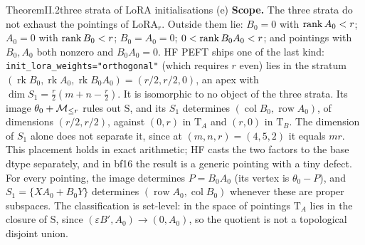 \begin{restate}{Theorem}{II.2}{three strata of LoRA initialisations}
(e) \textbf{Scope.} The three strata do not exhaust the pointings of LoRA$_r$. Outside them lie: $B_0=0$ with
$\operatorname{rank} A_0<r$; $A_0=0$ with $\operatorname{rank} B_0<r$; $B_0=A_0=0$; $0<\operatorname{rank} B_0A_0<r$; and pointings with $B_0,A_0$ both nonzero and
$B_0A_0=0$. HF PEFT ships one of the last kind: \texttt{init\_lora\_\allowbreak weights=\allowbreak"orthogonal"} (which
requires $r$ even) lies in the stratum $(\operatorname{rk}B_0,\operatorname{rk}A_0,\operatorname{rk}B_0A_0)=(r/2,r/2,0)$,
an apex with $\dim S_1=\tfrac r2(m+n-\tfrac r2)$. It is isomorphic to no object of the three strata. Its image
$\theta_0+\mathcal{M}_{\le r}$ rules out $\mathrm S$, and its $S_1$ determines $(\operatorname{col}B_0,\operatorname{row}A_0)$, of
dimensions $(r/2,r/2)$, against $(0,r)$ in $\mathrm T_A$ and $(r,0)$ in $\mathrm T_B$. The dimension of $S_1$ alone does
not separate it, since at $(m,n,r)=(4,5,2)$ it equals $mr$. This placement holds in exact arithmetic; HF casts the two
factors to the base dtype separately, and in bf16 the result is a generic pointing with a tiny defect. For every
pointing, the image determines $P=B_0A_0$ (its vertex is $\theta_0-P$), and $S_1=\{XA_0+B_0Y\}$ determines
$(\operatorname{row}A_0,\operatorname{col}B_0)$ whenever these are proper subspaces. The classification is set-level: in
the space of pointings $\mathrm T_A$ lies in the closure of $\mathrm S$, since $(\varepsilon B',A_0)\to(0,A_0)$, so the
quotient is not a topological disjoint union.
\end{restate}


